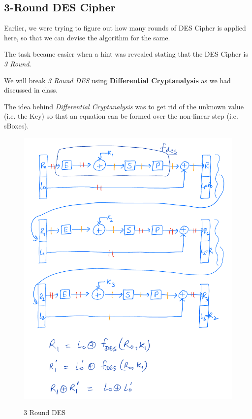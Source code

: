 \documentclass[10pt,twoside]{article}
\begin{document}
\subsection{3-Round DES Cipher}

Earlier, we were trying to figure out how many rounds of DES Cipher is applied here, so that we can devise the algorithm for the same. \newline

The task became easier when a hint was revealed stating that the DES Cipher is \textit{3 Round}. \newline

We will break \textit{3 Round DES} using \textbf{Differential Cryptanalysis} as we had discussed in class. \newline

The idea behind \textit{Differential Cryptanalysis} was to get rid of the unknown value (i.e. the Key) so that an equation can be formed over the non-linear step (i.e. sBoxes). \newline

\begin{figure}[H]
  \centering
  \includegraphics[scale=0.5]{des.pdf}
  \label{3-des}
  \caption{3 Round DES}
\end{figure}
\end{document}
